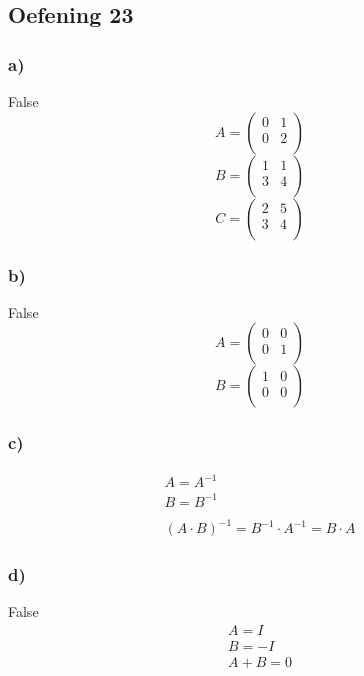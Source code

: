 \documentclass[lineaire_algebra_oplossingen.tex]{subfiles}
\begin{document}
\subsection{Oefening 23}
\subsubsection*{a)}
False
\[
A=\left(\begin{array}{cc}
    0 & 1\\
    0 & 2\\
\end{array} \right)
\]
\[
B=\left(\begin{array}{cc}
    1 & 1\\
    3 & 4\\
\end{array} \right)
\]
\[
C=\left(\begin{array}{cc}
    2 & 5\\
    3 & 4\\
\end{array} \right)
\]
\subsubsection*{b)}
 False
\[
A=\left(\begin{array}{cc}
    0 & 0\\
    0 & 1\\
\end{array} \right)
\]
\[
B=\left(\begin{array}{cc}
    1 & 0\\
    0 & 0\\
\end{array} \right)
\]
\subsubsection*{c)}
\begin{gather*}
A=A^{-1}\\
B=B^{-1}\\
\\
(A \cdot B)^{-1}=B^{-1} \cdot A^{-1}=B \cdot A
\end{gather*}

\subsubsection*{d)}
False
\begin{gather*}
A=I\\
B=-I\\
A+B=0
\end{gather*}
\end{document}
